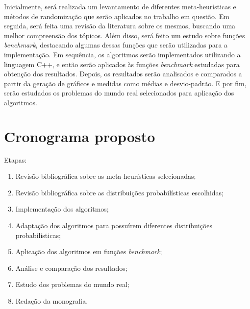 \documentclass[11pt]{article}
\begin{document}
Inicialmente, será realizada um levantamento de diferentes meta-heurísticas e métodos de randomização que serão aplicados no trabalho em questão. Em seguida, será feita uma revisão da literatura sobre os mesmos, buscando uma melhor compreensão dos tópicos. Além disso, será feito um estudo sobre funções \textit{benchmark}, destacando algumas dessas funções que serão utilizadas para a implementação. Em sequência, os algoritmos serão implementados utilizando a linguagem C++, e então serão aplicados às funções \textit{benchmark} estudadas para obtenção dos resultados. Depois, os resultados serão analisados e comparados a partir da geração de gráficos e medidas como médias e desvio-padrão. E por fim, serão estudados os problemas do mundo real selecionados para aplicação dos algoritmos.

\section{Cronograma proposto}
\label{cro}

Etapas:

\begin{enumerate}
    \item Revisão bibliográfica sobre as meta-heurísticas selecionadas;
    \item Revisão bibliográfica sobre as distribuições probabilísticas escolhidas;
    \item Implementação dos algoritmos;
    \item Adaptação dos algoritmos para possuírem diferentes distribuições probabilísticas;
    \item Aplicação dos algoritmos em funções \textit{benchmark};
    \item Análise e comparação dos resultados;
    \item Estudo dos problemas do mundo real;
    \item Redação da monografia.
\end{enumerate}
\end{document}
